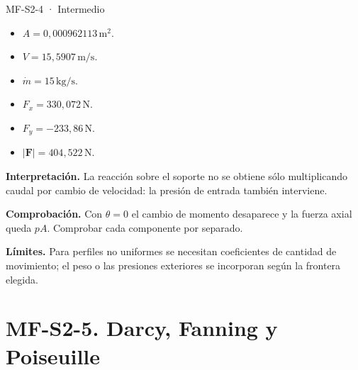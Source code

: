 \begin{studiumworked}{MF-S2-4 · Intermedio}
\begin{itemize}
\item $A=0{,}000962113\,\mathrm{m^2}$.

\item $V=15{,}5907\,\mathrm{m/s}$.

\item $\dot m=15\,\mathrm{kg/s}$.

\item $F_x=330{,}072\,\mathrm{N}$.

\item $F_y=-233{,}86\,\mathrm{N}$.

\item $|\boldsymbol F|=404{,}522\,\mathrm{N}$.

\end{itemize}

\textbf{Interpretación.} La reacción sobre el soporte no se obtiene sólo multiplicando caudal por cambio de velocidad: la presión de entrada también interviene.

\textbf{Comprobación.} Con $\theta=0$ el cambio de momento desaparece y la fuerza axial queda $pA$. Comprobar cada componente por separado.

\textbf{Límites.} Para perfiles no uniformes se necesitan coeficientes de cantidad de movimiento; el peso o las presiones exteriores se incorporan según la frontera elegida.

\end{studiumworked}

\Needspace{.30\textheight}\section{MF-S2-5. Darcy, Fanning y Poiseuille}


